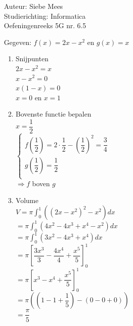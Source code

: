 \documentclass[a4paper]{article}
\begin{document}
  
\noindent \large Auteur: Siebe Mees \\
\noindent \large Studierichting: Informatica\\
\noindent \large Oefeningenreeks 5G nr. 6.5\\

\medskip

\normalsize

Gegeven: $f(x)=2x-x^2$ en $g(x)=x$\\

\begin{enumerate}

\item Snijpunten\\

$2x - x^2 = x$\\

$x - x^2 = 0$\\

$x(1 - x) = 0$\\

$x = 0 $ en $ x = 1$\\

\item Bovenste functie bepalen\\

$x = \dfrac{1}{2}$\\

$\left \{
\begin{array}{l}
f\left(\dfrac{1}{2}\right) = 2 \cdot \dfrac{1}{2} - \left(\dfrac{1}{2}\right)^2 = \dfrac{3}{4} \\

g\left(\dfrac{1}{2}\right) = \dfrac{1}{2} \\

\end{array}
\right .$\\

$ \Rightarrow f $ boven $ g$\\

\item Volume\\

$V = \pi \displaystyle\int_0^1 \left((2x - x^2)^2 - x^2 \right) dx$\\

$= \pi \displaystyle\int_0^1 (4x^2 - 4x^3 + x^4 - x^2) dx$\\

$= \pi \displaystyle\int_0^1 (3x^2 - 4x^3 + x^4) dx$\\

$= \pi \left[ \dfrac{3x^3}{3} - \dfrac{4x^4}{4} + \dfrac{x^5}{5} \right]_0^1$\\

$= \pi \left[ x^3 - x^4 + \dfrac{x^5}{5} \right]_0^1$\\

$= \pi \left( \left(1 - 1 + \dfrac{1}{5}\right) - (0 - 0 + 0) \right)$\\

$= \dfrac{\pi}{5}$\\

\end{enumerate}
\end{document}
